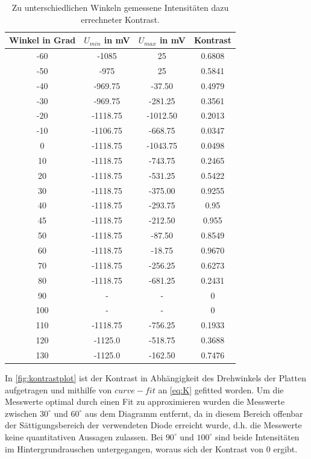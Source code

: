 \begin{table}[H]
  \center
  \caption{Zu unterschiedlichen Winkeln gemessene Intensitäten dazu errechneter Kontrast.}
  \label{tab:Kontrast}
\begin{tabular}{c|c|c|c}
  Winkel in Grad& $U_{min}$ in mV& $U_{max}$ in mV& Kontrast\\
  \hline
  -60 &    -1085&       25& 0.6808\\
  -50 &     -975&       25& 0.5841\\
  -40 &  -969.75&   -37.50& 0.4979\\
  -30 &  -969.75&  -281.25& 0.3561\\
  -20 & -1118.75& -1012.50& 0.2013\\
  -10 & -1106.75&  -668.75& 0.0347\\
  0   & -1118.75& -1043.75& 0.0498\\
  10  & -1118.75&  -743.75& 0.2465\\
  20  & -1118.75&  -531.25& 0.5422\\
  30  & -1118.75&  -375.00& 0.9255\\
  40  & -1118.75&  -293.75& 0.95\\
  45  & -1118.75&  -212.50& 0.955\\
  50  & -1118.75&   -87.50& 0.8549\\
  \hline
  60  & -1118.75&   -18.75& 0.9670\\
  \hline
  70  & -1118.75&  -256.25& 0.6273\\
  80  & -1118.75&  -681.25& 0.2431\\
  90  &        -&        -&      0\\
  100 &        -&        -&      0\\
  110 & -1118.75&  -756.25& 0.1933\\
  120 &  -1125.0&  -518.75& 0.3688\\
  130 &  -1125.0&  -162.50& 0.7476\\
\end{tabular}
\end{table}
In \ref{fig:kontrastplot} ist der Kontrast in Abhängigkeit des Drehwinkels der Platten aufgetragen und mithilfe von $curve-fit$ \cite{scipy} an \eqref{eq:K} gefitted worden.
Um die Messwerte optimal durch einen Fit zu approximieren wurden die Messwerte zwischen $30^\circ$ und $60^\circ$ aus dem Diagramm entfernt, da in diesem Bereich offenbar der Sättigungsbereich der verwendeten Diode erreicht wurde, d.h. die Messwerte keine quantitativen Aussagen zulassen. Bei $90^\circ$ und $100^\circ$ sind beide Intensitäten im Hintergrundrauschen untergegangen, woraus sich der Kontrast von 0 ergibt.\\
